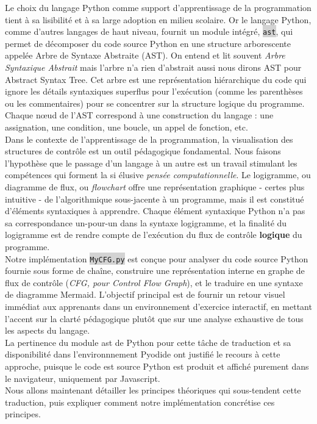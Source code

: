 \documentclass[11pt,a4paper]{article}
\newcommand{\code}[1]{\colorbox{lightgray}{\texttt{\small #1}}}
\begin{document}
Le choix du langage Python comme support d'apprentissage de la programmation tient à sa lisibilité et à sa large adoption en milieu scolaire. Or le langage Python, comme d'autres langages de haut niveau, fournit un module intégré, \code{ast}, qui permet de décomposer du code source Python en une structure arborescente appelée Arbre de Syntaxe Abstraite (AST). On entend et lit souvent \textit{Arbre Syntaxique Abstrait} mais l'arbre n'a rien d'abstrait aussi nous dirons AST pour Abstract Syntax Tree. Cet arbre est une représentation hiérarchique du code qui ignore les détails syntaxiques superflus pour l'exécution (comme les parenthèses ou les commentaires) pour se concentrer sur la structure logique du programme. Chaque nœud de l'AST correspond à une construction du langage : une assignation, une condition, une boucle, un appel de fonction, etc. \\
Dans le contexte de l'apprentissage de la programmation, la visualisation des structures de contrôle est un outil pédagogique fondamental. Nous faisons l'hypothèse que le passage d'un langage à un autre est un travail stimulant les compétences qui forment la si élusive \textit{pensée computationnelle}. Le logigramme, ou diagramme de flux, ou \textit{flowchart} offre une représentation graphique - certes plus intuitive - de l'algorithmique sous-jacente à un programme, mais il est constitué d'éléments syntaxiques à apprendre. Chaque élément syntaxique Python n'a pas sa correspondance un-pour-un dans la syntaxe logigramme, et la finalité du logigramme est de rendre compte de l'exécution du flux de contrôle \textbf{logique} du programme. \\
Notre implémentation \code{MyCFG.py} est conçue pour analyser du code source Python fournie sous forme de chaîne, construire une représentation interne en graphe de flux de contrôle (\textit{CFG, pour Control Flow Graph}), et le traduire en une syntaxe de diagramme Mermaid. L'objectif principal est de fournir un retour visuel immédiat aux apprenants dans un environnement d'exercice interactif, en mettant l'accent sur la clarté pédagogique plutôt que sur une analyse exhaustive de tous les aspects du langage.\\
La pertinence du module ast de Python pour cette tâche de traduction et sa disponibilité dans l'environnnement Pyodide ont justifié le recours à cette approche, puisque le code est source Python est produit et affiché purement dans le navigateur, uniquement par Javascript. \\ Nous allons maintenant détailler les principes théoriques qui sous-tendent cette traduction, puis expliquer comment notre implémentation concrétise ces principes. 
\end{document}
